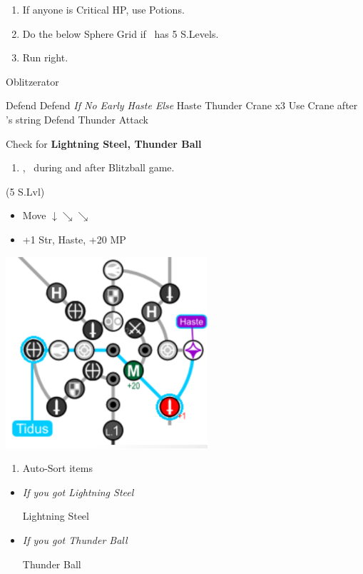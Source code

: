 \begin{enumerate}[resume]
	\item If anyone is Critical HP, use Potions.
	\item Do the below Sphere Grid if \tidus\ has 5 S.Levels.
	\item Run right. 
\end{enumerate}
\begin{battle}[3000]{Oblitzerator}
	\begin{itemize}
		\kimahrif Defend
		\tidusf Defend \textit{If No Early Haste Else} Haste \lulu
		\luluf Thunder Crane x3
		\tidusf Use Crane after \lulu's string
		\kimahrif Defend
		\luluf Thunder
		\tidusf Attack
	\end{itemize}
	Check for \textbf{Lightning Steel, Thunder Ball}
\end{battle}
\begin{enumerate}[resume]
	\item \cs[2:00], \sd\ during and after Blitzball game.
\end{enumerate}
\begin{spheregrid}
	\begin{itemize}
		\tidusf (5 S.Lvl)
		\begin{itemize}
			\item Move $\downarrow \searrow\searrow$
			\item +1 Str, Haste, +20 MP
		\end{itemize}
	\end{itemize}
	\includegraphics{graphics/haste}
\end{spheregrid}
\begin{enumerate}[resume]
	\item Auto-Sort items
\end{enumerate}
\begin{equip}
	\begin{itemize}
		\item \textit{If you got Lightning Steel}
		      \begin{itemize}
			      \tidusf Lightning Steel
		      \end{itemize}
		\item \textit{If you got Thunder Ball}
		      \begin{itemize}
			      \wakkaf Thunder Ball
		      \end{itemize}
	\end{itemize}
\end{equip}
